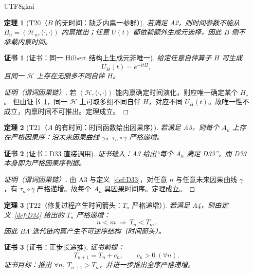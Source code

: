 \documentclass[12pt]{article}
\newtheorem{theorem}{定理}[section]
\newtheorem{Certificate}{证书}[section]
\begin{document}
\begin{CJK*}{UTF8}{gkai}
\begin{theorem}[T20（$B$ 的无时间：缺乏内禀一参群）]
\label{thm:T20}
若满足 A2，则时间参数不能从 $B_n=(\mathcal H_n,\langle\cdot,\cdot\rangle)$ 内禀推出；任意 $U(t)$ 都依赖额外生成元选择，因此 $B$ 侧不承载内禀时间。
\end{theorem}

\begin{Certificate}[证书：同一 Hilbert 结构上生成元非唯一]
\label{cert:T20}
给定任意自伴算子 $H$ 可生成
\[
U_H(t)=e^{-itH},
\]
且同一 $\mathcal H$ 上存在无限多不同自伴 $H$。
\end{Certificate}

\begin{proof}[证明（谓词因果链）]
若 $(\mathcal H,\langle\cdot,\cdot\rangle)$ 能内禀确定时间演化，则应唯一确定某个 $H_\star$。
但由证书~\ref{cert:T20}，同一 $\mathcal H$ 上可取多组不同自伴 $H$，对应不同 $U_H(t)$。故唯一性不成立，内禀时间不可推出。定理成立。
\end{proof}

\begin{theorem}[T21（$A$ 的有时间：时间函数给出因果序）]
\label{thm:T21}
若满足 A3，则每个 $A_n$ 上存在严格因果序：沿未来因果曲线 $\gamma$，$\tau_n\circ\gamma$ 严格递增。
\end{theorem}

\begin{Certificate}[证书：D33 直接调用]
\label{cert:T21}
证书输入：A3 给出“每个 $A_n$ 满足 D33”，而 D33 本身即为严格因果序判据。
\end{Certificate}

\begin{proof}[证明（谓词因果链）]
由 A3 与定义~\ref{def:D33}，对任意 $n$ 与任意未来因果曲线 $\gamma$，有 $\tau_n\circ\gamma$ 严格递增。故每个 $A_n$ 具因果时间序。定理成立。
\end{proof}

\begin{theorem}[T22（修复过程产生时间箭头：$T_n$ 严格递增）]
\label{thm:T22}
若满足 A4，则由定义~\ref{def:D34} 给出的 $T_n$ 严格递增：
\[
n<m\ \Rightarrow\ T_n<T_m.
\]
因此 BA 迭代链内禀产生不可逆序结构（时间箭头）。
\end{theorem}

\begin{Certificate}[证书：正步长递推]
\label{cert:T22}
证书前提：
\[
T_{n+1}=T_n+c_n,\qquad c_n>0\ (\forall n).
\]
证书目标：推出 $\forall n,\ T_{n+1}>T_n$，并进一步推出全序严格递增。
\end{Certificate}


\end{CJK*}
\end{document}

